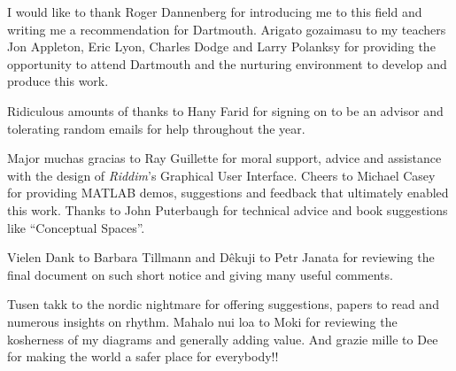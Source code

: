 I would like to thank Roger Dannenberg for introducing me to this
field and writing me a recommendation for Dartmouth. Arigato gozaimasu
to my teachers Jon Appleton, Eric Lyon, Charles Dodge 
and Larry Polanksy for providing the opportunity to attend Dartmouth 
and the nurturing environment to develop and produce this work.  

Ridiculous amounts of thanks to Hany Farid for signing on to be an
advisor and tolerating random emails for help throughout the year.

Major muchas gracias to Ray Guillette for moral support, advice and 
assistance with the design of {\it Riddim}'s Graphical User
Interface. Cheers to Michael Casey for providing MATLAB demos, 
suggestions and feedback that ultimately enabled this work. Thanks to 
John Puterbaugh for technical advice and book suggestions 
like ``Conceptual Spaces''.

Vielen Dank to Barbara Tillmann and D{\^ e}kuji to Petr Janata for 
reviewing the final document on such short notice and giving many 
useful comments.

Tusen takk to the nordic nightmare for offering suggestions, papers to
read and numerous insights on rhythm. Mahalo nui loa to Moki for 
reviewing the kosherness of my diagrams and generally adding
value. And grazie mille to Dee for making the world a safer place 
for everybody!!

